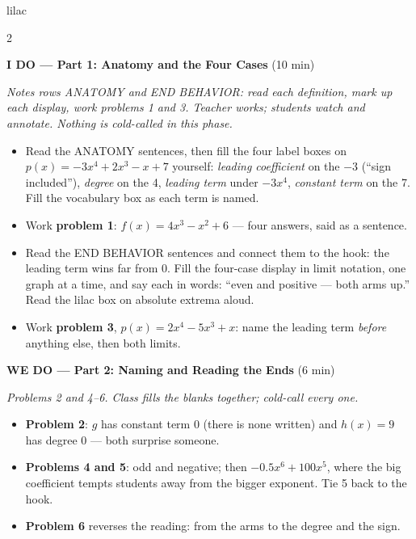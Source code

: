 \documentclass[10pt]{article}
\begin{document}
\begin{skillbox}{lilac}
\begin{multicols}{2}

\textbf{I DO --- Part 1: Anatomy and the Four Cases} (10 min)

\textit{Notes rows ANATOMY and END BEHAVIOR: read each definition, mark up each display, work
problems 1 and 3. Teacher works; students watch and annotate. Nothing is cold-called in this
phase.}
\begin{itemize}
  \item Read the ANATOMY sentences, then fill the four label boxes on
        $p(x) = -3x^4 + 2x^3 - x + 7$ yourself: \textit{leading coefficient} on the $-3$
        (``sign included''), \textit{degree} on the 4, \textit{leading term} under $-3x^4$,
        \textit{constant term} on the 7. Fill the vocabulary box as each term is named.
  \item Work \textbf{problem 1}: $f(x) = 4x^3 - x^2 + 6$ --- four answers, said as a sentence.
  \item Read the END BEHAVIOR sentences and connect them to the hook: the leading term wins
        far from 0. Fill the four-case display in limit notation, one graph at a time, and
        say each in words: ``even and positive --- both arms up.'' Read the lilac box on
        absolute extrema aloud.
  \item Work \textbf{problem 3}, $p(x) = 2x^4 - 5x^3 + x$: name the leading term
        \emph{before} anything else, then both limits.
\end{itemize}

\textbf{WE DO --- Part 2: Naming and Reading the Ends} (6 min)

\textit{Problems 2 and 4--6. Class fills the blanks together; cold-call every one.}
\begin{itemize}
  \item \textbf{Problem 2}: $g$ has constant term 0 (there is none written) and $h(x) = 9$ has
        degree 0 --- both surprise someone.
  \item \textbf{Problems 4 and 5}: odd and negative; then $-0.5x^6 + 100x^5$, where the big
        coefficient tempts students away from the bigger exponent. Tie 5 back to the hook.
  \item \textbf{Problem 6} reverses the reading: from the arms to the degree and the sign.
\end{itemize}

\columnbreak


\end{multicols}
\end{skillbox}
\end{document}
